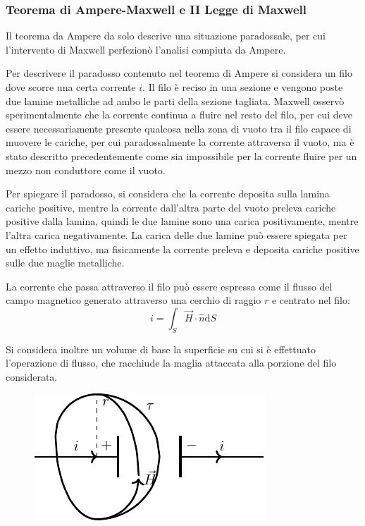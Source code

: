 \documentclass{article}
\newcommand{\df}{\mathrm{d}}
\numberwithin{equation}{subsection}
\begin{document}
\subsubsection{Teorema di Ampere-Maxwell e II Legge di Maxwell}
Il teorema da Ampere da solo descrive una situazione paradossale, per cui l'intervento di Maxwell perfezionò l'analisi compiuta da Ampere. 

Per descrivere il paradosso contenuto nel teorema di Ampere si considera un filo dove scorre una certa corrente $i$. Il filo è reciso in una sezione e vengono poste due 
lamine metalliche ad ambo le parti della sezione tagliata. Maxwell osservò sperimentalmente che la corrente continua a fluire nel resto del filo, per cui deve essere 
necessariamente presente qualcosa nella zona di vuoto tra il filo capace di muovere le cariche, per cui paradossalmente la corrente attraversa il vuoto, ma è stato descritto 
precedentemente come sia impossibile per la corrente fluire per un mezzo non conduttore come il vuoto. 

Per spiegare il paradosso, si considera che la corrente deposita sulla lamina cariche positive, mentre la corrente dall'altra parte del vuoto preleva cariche positive dalla lamina, 
quindi le due lamine sono una carica positivamente, mentre l'altra carica negativamente. La carica delle due lamine può essere spiegata per un effetto induttivo, ma fisicamente 
la corrente preleva e deposita cariche positive sulle due maglie metalliche. 


La corrente che passa attraverso il filo può essere espressa come il flusso del campo magnetico generato attraverso una cerchio di raggio $r$ e centrato nel filo:
\begin{equation*}
    i=\int_S{\vec{H}}\cdot\hat{n}\df S
\end{equation*} 

Si considera inoltre un volume di base la superficie su cui si è effettuato l'operazione di flusso, che racchiude la maglia attaccata alla porzione del filo considerata. 

\begin{figure}[H]%
    \centering
    \includegraphics{flusso-filo-reciso.pdf}
    \label{fig:flusso-filo-reciso}
\end{figure}
\end{document}
